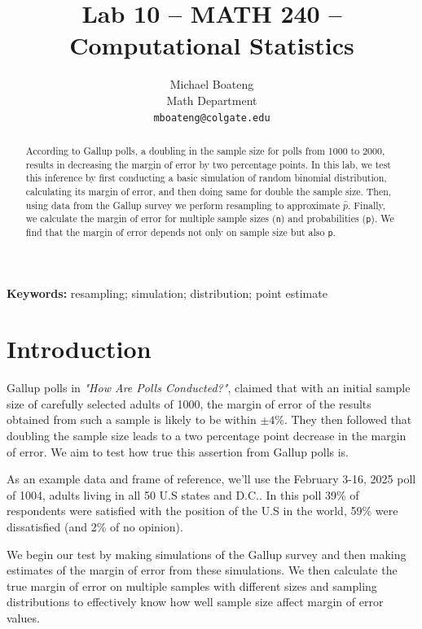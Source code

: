 \documentclass{article}\usepackage[]{graphicx}\usepackage[]{xcolor}
\begin{document}
\vspace{-1in}
\title{Lab 10 -- MATH 240 -- Computational Statistics}

\author{
  Michael Boateng \\
  Math Department  \\
  {\tt mboateng@colgate.edu}
}

\date{}

\maketitle

\begin{multicols}{2}
\begin{abstract}
According to Gallup polls, a doubling in the sample size for polls from 1000 to 2000, results in decreasing the margin of error by two percentage points. In this lab, we test this inference by first conducting a basic simulation of random binomial distribution, calculating its margin of error, and then doing same for double the sample size. Then, using data from the Gallup survey we perform resampling to approximate $\hat{p}$. Finally, we calculate the margin of error for multiple sample sizes (\texttt{n}) and probabilities (\texttt{p}). We find that the margin of error depends not only on sample size but also \texttt{p}. 
\end{abstract}

\noindent \textbf{Keywords:} resampling; simulation; distribution; point estimate

\section{Introduction}
Gallup polls in \emph{"How Are Polls Conducted?"}, claimed that with an initial sample size of carefully selected adults of 1000, the margin of error of the results obtained from such a sample is likely to be within $\pm 4 \%$. They then followed that doubling the sample size leads to a two percentage point decrease in the margin of error. We aim to test how true this assertion from Gallup polls is. 

As an example data and frame of reference, we'll use the February 3-16, 2025 poll of 1004, adults living in all 50 U.S states and D.C.. In this poll 39\% of respondents were satisfied with the position of the U.S in the world, 59\% were dissatisfied (and 2\% of no opinion).

We begin our test by making simulations of the Gallup survey and then making estimates of the margin of error from these simulations. We then calculate the true margin of error on multiple samples with different sizes and sampling distributions to effectively know how well sample size affect margin of error values. 
 

\end{multicols}
\end{document}
